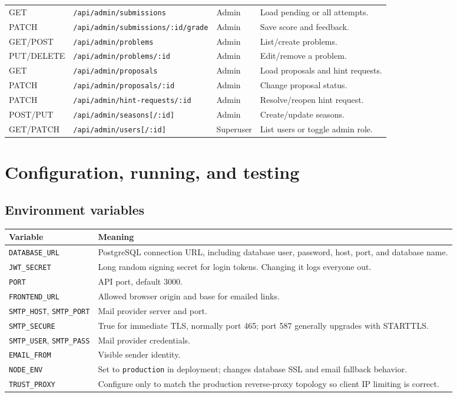 \documentclass[11pt,oneside]{book}
\newcommand{\route}[1]{\texttt{#1}}
\newcommand{\code}[1]{\texttt{#1}}
\begin{document}
\begin{longtable}{p{} p{} p{} p{}}
GET & \route{/api/admin/submissions} & Admin & Load pending or all attempts. \\
PATCH & \route{/api/admin/submissions/:id/grade} & Admin & Save score and feedback. \\
GET/POST & \route{/api/admin/problems} & Admin & List/create problems. \\
PUT/DELETE & \route{/api/admin/problems/:id} & Admin & Edit/remove a problem. \\
GET & \route{/api/admin/proposals} & Admin & Load proposals and hint requests. \\
PATCH & \route{/api/admin/proposals/:id} & Admin & Change proposal status. \\
PATCH & \route{/api/admin/hint-requests/:id} & Admin & Resolve/reopen hint request. \\
POST/PUT & \route{/api/admin/seasons[/:id]} & Admin & Create/update seasons. \\
GET/PATCH & \route{/api/admin/users[/:id]} & Superuser & List users or toggle admin role. \\
\bottomrule
\end{longtable}
\normalsize

\chapter{Configuration, running, and testing}

\section{Environment variables}
\begin{longtable}{p{} p{}}
\toprule
Variable & Meaning \\
\midrule
\endhead
\code{DATABASE\_URL} & PostgreSQL connection URL, including database user, password, host, port, and database name. \\
\code{JWT\_SECRET} & Long random signing secret for login tokens. Changing it logs everyone out. \\
\code{PORT} & API port, default 3000. \\
\code{FRONTEND\_URL} & Allowed browser origin and base for emailed links. \\
\code{SMTP\_HOST}, \code{SMTP\_PORT} & Mail provider server and port. \\
\code{SMTP\_SECURE} & True for immediate TLS, normally port 465; port 587 generally upgrades with STARTTLS. \\
\code{SMTP\_USER}, \code{SMTP\_PASS} & Mail provider credentials. \\
\code{EMAIL\_FROM} & Visible sender identity. \\
\code{NODE\_ENV} & Set to \code{production} in deployment; changes database SSL and email fallback behavior. \\
\code{TRUST\_PROXY} & Configure only to match the production reverse-proxy topology so client IP limiting is correct. \\
\bottomrule
\end{longtable}
\end{document}
